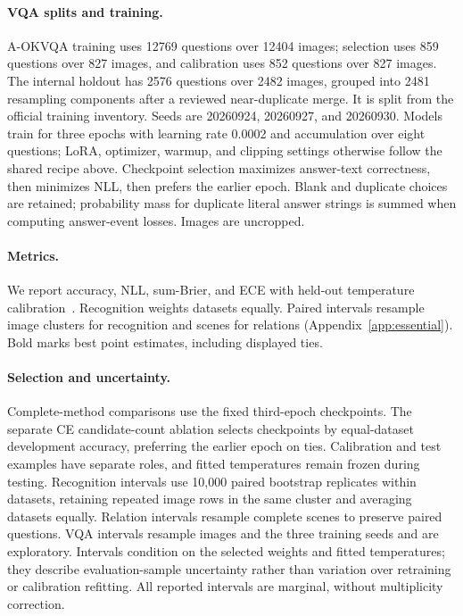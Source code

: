 \paragraph{VQA splits and training.}
A-OKVQA training uses 12769 questions over 12404 images; selection uses 859 questions over 827 images, and calibration uses 852 questions over 827 images. The internal holdout has 2576 questions over 2482 images, grouped into 2481 resampling components after a reviewed near-duplicate merge. It is split from the official training inventory. Seeds are 20260924, 20260927, and 20260930. Models train for three epochs with learning rate 0.0002 and accumulation over eight questions; LoRA, optimizer, warmup, and clipping settings otherwise follow the shared recipe above. Checkpoint selection maximizes answer-text correctness, then minimizes NLL, then prefers the earlier epoch. Blank and duplicate choices are retained; probability mass for duplicate literal answer strings is summed when computing answer-event losses. Images are uncropped.

\paragraph{Metrics.} We report accuracy, NLL, sum-Brier, and ECE with held-out temperature calibration~\citep{guo_2017_calibration}. Recognition weights datasets equally. Paired intervals resample image clusters for recognition and scenes for relations (Appendix~\ref{app:essential}). Bold marks best point estimates, including displayed ties.

\paragraph{Selection and uncertainty.}
Complete-method comparisons use the fixed third-epoch checkpoints. The separate CE candidate-count ablation selects checkpoints by equal-dataset development accuracy, preferring the earlier epoch on ties. Calibration and test examples have separate roles, and fitted temperatures remain frozen during testing. Recognition intervals use 10,000 paired bootstrap replicates within datasets, retaining repeated image rows in the same cluster and averaging datasets equally. Relation intervals resample complete scenes to preserve paired questions. VQA intervals resample images and the three training seeds and are exploratory. Intervals condition on the selected weights and fitted temperatures; they describe evaluation-sample uncertainty rather than variation over retraining or calibration refitting. All reported intervals are marginal, without multiplicity correction.
